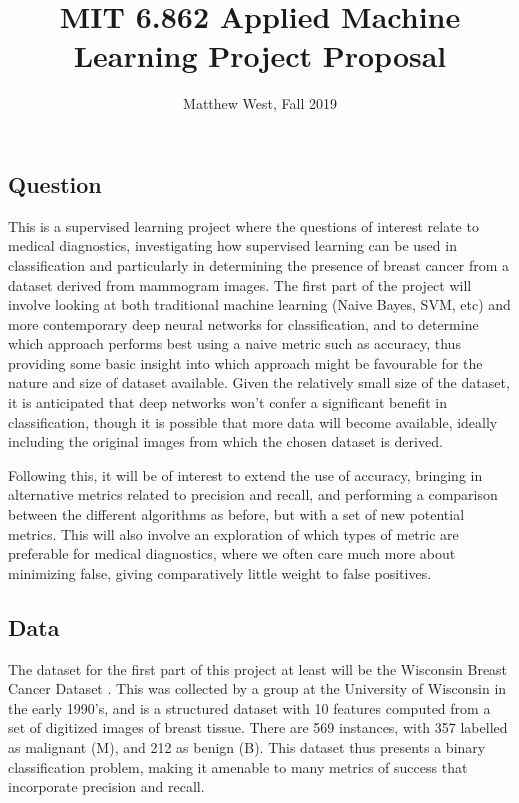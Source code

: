 \documentclass[11pt]{article}
\title{MIT 6.862 Applied Machine Learning Project Proposal}
\author{Matthew West, Fall 2019}
\begin{document}
\date{}
\maketitle

\subsection*{Question}
This is a supervised learning project where the questions of interest relate to medical diagnostics, investigating how supervised learning can be used in classification and particularly in determining the presence of breast cancer from a dataset derived from mammogram images. The first part of the project will involve looking at both traditional machine learning (Naive Bayes, SVM, etc) and more contemporary deep neural networks for classification, and to determine which approach performs best using a naive metric such as accuracy, thus providing some basic insight into which approach might be favourable for the nature and size of dataset available. Given the relatively small size of the dataset, it is anticipated that deep networks won't confer a significant benefit in classification, though it is possible that more data will become available, ideally including the original images from which the chosen dataset is derived. 

Following this, it will be of interest to extend the use of accuracy, bringing in alternative metrics related to precision and recall, and performing a comparison between the different algorithms as before, but with a set of new potential metrics. This will also involve an exploration of which types of metric are preferable for medical diagnostics, where we often care much more about minimizing false, giving comparatively little weight to false positives.

\subsection*{Data}
The dataset for the first part of this project at least will be the Wisconsin Breast Cancer Dataset \cite{Dua:2019}. This was collected by a group at the University of Wisconsin in the early 1990's, and is a structured dataset with 10 features computed from a set of digitized images of breast tissue. There are 569 instances, with 357 labelled as malignant (M), and 212 as benign (B). This dataset thus presents a binary classification problem, making it amenable to many metrics of success that incorporate precision and recall.
\end{document}
